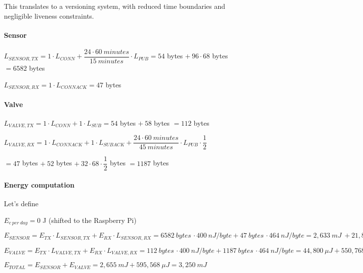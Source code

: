 \documentclass[a4paper,11pt]{article} %
\begin{document}
    This translates to a versioning system, with reduced time boundaries and negligible liveness constraints.

    \paragraph{Sensor}

    $L_{SENSOR, TX} = 1 \cdot L_{CONN} + \dfrac{24 \cdot 60\ minutes}{15\ minutes} \cdot L_{PUB} = 54$ bytes $+\ 96 \cdot 68$ bytes $ = 6582$ bytes

    \medskip

    $L_{SENSOR, RX} = 1 \cdot L_{CONNACK} = 47$ bytes

    \paragraph{Valve}

    $L_{VALVE, TX} = 1 \cdot L_{CONN} + 1 \cdot L_{SUB} = 54$ bytes $+\ 58$ bytes $ = 112$ bytes

    \medskip

    $L_{VALVE, RX} = 1 \cdot L_{CONNACK} + 1 \cdot L_{SUBACK} + \dfrac{24 \cdot 60\ minutes}{45\ minutes} \cdot L_{PUB} \cdot \dfrac{1}{2}$

    \medskip

    \qquad \qquad \qquad $= 47$ bytes $+\ 52$ bytes $+\ 32 \cdot 68 \cdot \dfrac{1}{2}$ bytes $= 1187$ bytes

    \paragraph{Energy computation}

    Let's define

    \medskip

    $E_{c \ per \ day} = 0$ J (shifted to the Raspberry Pi)

    \medskip

    $E_{SENSOR} = E_{TX} \cdot L_{SENSOR, TX} + E_{RX} \cdot L_{SENSOR, RX} = 6582\ bytes \, \cdot 400\ nJ/byte + 47\ bytes \, \cdot 464\ nJ/byte = 2,633\ mJ\ + 21,808\ \mu J = 2,655\ mJ$

    \medskip

    $E_{VALVE} = E_{TX} \cdot L_{VALVE, TX} + E_{RX} \cdot L_{VALVE, RX} = 112\ bytes \, \cdot 400\ nJ/byte + 1187\ bytes \, \cdot 464\ nJ/byte = 44,800\ \mu J + 550,768\ \mu J = 595,568\ \mu J$

    \medskip

    $E_{TOTAL} = E_{SENSOR} + E_{VALVE} = 2,655\ mJ + 595,568\ \mu J = 3,250\ mJ$
\end{document}

